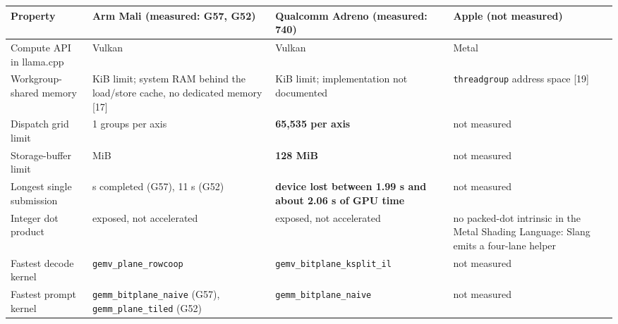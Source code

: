 \documentclass[
  10pt,
]{article}
\newcounter{none} %
\begin{document}
{\def\LTcaptype{none} %
\begin{longtable}[]{@{}
  >{\raggedright\arraybackslash}p{}
  >{\raggedright\arraybackslash}p{}
  >{\raggedright\arraybackslash}p{}
  >{\raggedright\arraybackslash}p{}@{}}
\toprule\noalign{}
\begin{minipage}[b]{\linewidth}\raggedright%
Property
\end{minipage} & \begin{minipage}[b]{\linewidth}\raggedright%
Arm Mali (measured: G57, G52)
\end{minipage} & \begin{minipage}[b]{\linewidth}\raggedright%
Qualcomm Adreno (measured: 740)
\end{minipage} & \begin{minipage}[b]{\linewidth}\raggedright%
Apple (not measured)
\end{minipage} \\
\midrule\noalign{}
\endhead%
\bottomrule\noalign{}
\endlastfoot%
Compute API in llama.cpp & Vulkan & Vulkan & Metal \\
Workgroup-shared memory & 32 KiB limit; system RAM behind the load/store
cache, no dedicated memory [17] & 32 KiB limit; implementation not
documented & \texttt{threadgroup} address space [19] \\
Dispatch grid limit & 2\textthreesuperior{}\texttwosuperior{}\textminus{}1 groups per axis & \textbf{65,535 per axis} &
not measured \\
Storage-buffer limit & 256 MiB & \textbf{128 MiB} & not measured \\
Longest single submission & 32 s completed (G57), 11 s (G52) &
\textbf{device lost between 1.99 s and about 2.06 s of GPU time} & not
measured \\
Integer dot product & exposed, not accelerated & exposed, not
accelerated & no packed-dot intrinsic in the Metal Shading Language:
Slang emits a four-lane helper \\
Fastest decode kernel & \texttt{gemv\_plane\_rowcoop} &
\texttt{gemv\_bitplane\_ksplit\_il} & not measured \\
Fastest prompt kernel & \texttt{gemm\_bitplane\_naive} (G57),
\texttt{gemm\_plane\_tiled} (G52) & \texttt{gemm\_bitplane\_naive} & not
measured \\
\end{longtable}
}
\end{document}
